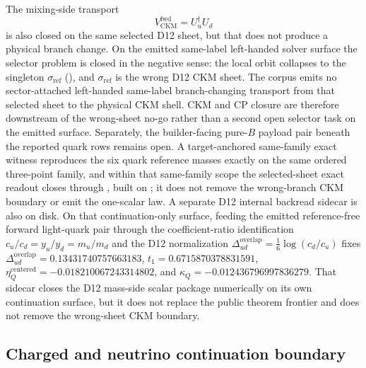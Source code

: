 The mixing-side transport
\[
V_{\mathrm{CKM}}^{\mathrm{fwd}}=U_u^\dagger U_d
\]
is also closed on the same selected D12 sheet, but that does not produce a physical branch change. On the emitted same-label left-handed solver surface the selector problem is closed in the negative sense: the local orbit collapses to the singleton \(\sigma_{\mathrm{ref}}\) (), and \(\sigma_{\mathrm{ref}}\) is the wrong D12 CKM sheet. The corpus emits no sector-attached left-handed same-label branch-changing transport from that selected sheet to the physical CKM shell. CKM and CP closure are therefore downstream of the wrong-sheet no-go rather than a second open selector task on the emitted surface. Separately, the builder-facing pure-\(B\) payload pair beneath the reported quark rows remains open.
A target-anchored same-family exact witness reproduces the six quark reference masses exactly on the same ordered three-point family, and within that same-family scope the selected-sheet exact readout closes through , built on ; it does not remove the wrong-branch CKM boundary or emit the one-scalar law.
A separate D12 internal backread sidecar is also on disk. On that continuation-only surface, feeding the emitted reference-free forward light-quark pair through the coefficient-ratio identification \(c_u/c_d=y_u/y_d=m_u/m_d\) and the D12 normalization \(\Delta_{ud}^{\mathrm{overlap}}=\tfrac16\log(c_d/c_u)\) fixes \(\Delta_{ud}^{\mathrm{overlap}}=0.13431740757663183\), \(t_1=0.6715870378831591\), \(\eta_Q^{\mathrm{centered}}=-0.018210067243314802\), and \(\kappa_Q=-0.012436796997836279\). That sidecar closes the D12 mass-side scalar package numerically on its own continuation surface, but it does not replace the public theorem frontier and does not remove the wrong-sheet CKM boundary.

\subsection{Charged and neutrino continuation boundary}

